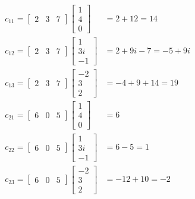 \begin{align*}
    c_{11}=
    \begin{bmatrix}
        2 & 3 & 7
    \end{bmatrix}
    \begin{bmatrix}
        1 \\ 4 \\ 0
    \end{bmatrix} & = 2 + 12 =14\\
    c_{12}=
    \begin{bmatrix}
        2 & 3 & 7
    \end{bmatrix}
    \begin{bmatrix}
        1 \\ 3i \\ -1
    \end{bmatrix} & = 2 + 9i -7 = -5 + 9i\\
    c_{13}=
    \begin{bmatrix}
        2 & 3 & 7
    \end{bmatrix}
    \begin{bmatrix}
        -2 \\ 3 \\ 2 
    \end{bmatrix} & = -4 +9 +14 = 19\\
    c_{21}=
    \begin{bmatrix}
        6 & 0 & 5
    \end{bmatrix}
    \begin{bmatrix}
        1 \\ 4 \\ 0
    \end{bmatrix} & =6\\
    c_{22}=
    \begin{bmatrix}
        6 & 0 & 5
    \end{bmatrix}
    \begin{bmatrix}
        1 \\ 3i \\ -1
    \end{bmatrix} & = 6-5=1 \\
    c_{23}=
    \begin{bmatrix}
        6 & 0 & 5
    \end{bmatrix}
    \begin{bmatrix}
        -2 \\ 3 \\ 2 
    \end{bmatrix}& = -12+10=-2\\
\end{align*}

